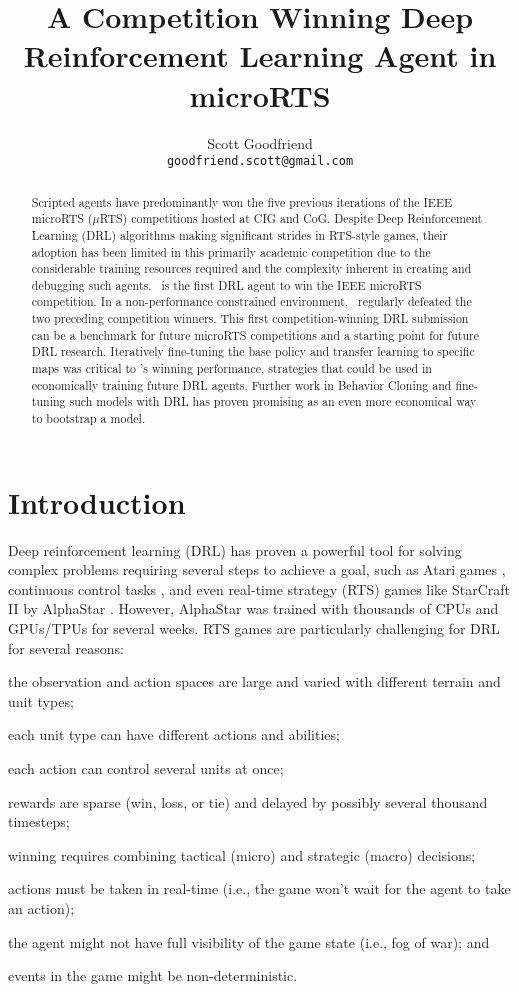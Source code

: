 \documentclass{article}
\title{A Competition Winning Deep Reinforcement Learning Agent in microRTS}
\author{Scott Goodfriend \\
\texttt{goodfriend.scott@gmail.com} \\
}
\begin{document}
\maketitle
\begin{abstract}
    Scripted agents have predominantly won the five
    previous iterations of the IEEE microRTS ($\mu$RTS) competitions hosted at CIG and
    CoG. Despite Deep Reinforcement Learning (DRL) algorithms making significant strides
    in RTS-style games, their adoption has been limited in this primarily academic
    competition due to the considerable training resources required and the complexity
    inherent in creating and debugging such agents. \agentName\ is the first DRL agent
    to win the IEEE microRTS competition. In a
    non-performance constrained environment, \agentName\ regularly defeated the two
    preceding competition winners. This first competition-winning DRL submission can be
    a benchmark for future microRTS competitions and a starting point for future DRL
    research. Iteratively fine-tuning the base policy and transfer learning to specific maps was 
    critical to \agentName's winning performance, strategies that could be used in
    economically training future DRL agents. Further work in Behavior Cloning and
    fine-tuning such models with DRL has proven promising as an even more economical way
    to bootstrap a model.
\end{abstract}
\section{Introduction}
Deep reinforcement learning (DRL) has proven a powerful tool for solving complex
problems requiring several steps to achieve a goal, such as Atari games \citep{DBLP:journals/corr/MnihKSGAWR13}, continuous
control tasks \citep{DBLP:journals/corr/LillicrapHPHETS15}, and even real-time strategy
(RTS) games like StarCraft II by AlphaStar \citep{Vinyals2019GrandmasterLI}. However, AlphaStar was trained with thousands of
CPUs and GPUs/TPUs for several weeks. RTS games are particularly challenging for DRL for
several reasons:
\begin{inparaenum}[(1)]
    \item the observation and action spaces are large and varied with different terrain and
        unit types;
    \item each unit type can have different actions and abilities;
    \item each action can control several units at once;
    \item rewards are sparse (win, loss, or tie) and delayed by possibly several
    thousand timesteps;
    \item winning requires combining tactical (micro) and strategic (macro) decisions;
    \item actions must be taken in real-time (i.e., the game won't wait for the agent to
        take an action);
    \item the agent might not have full visibility of the game state (i.e., fog of war); and
    \item events in the game might be non-deterministic.
\end{inparaenum}
\end{document}
